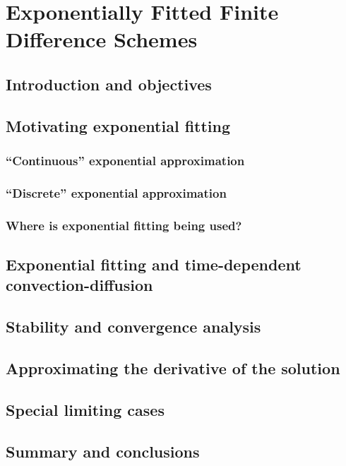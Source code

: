 \chapter{Exponentially Fitted Finite Difference Schemes}

\section{Introduction and objectives}

\section{Motivating exponential fitting}

\subsection{``Continuous'' exponential approximation}

\subsection{``Discrete'' exponential approximation}

\subsection{Where is exponential fitting being used?}

\section{Exponential fitting and time-dependent convection-diffusion}

\section{Stability and convergence analysis}

\section{Approximating the derivative of the solution}

\section{Special limiting cases}

\section{Summary and conclusions}